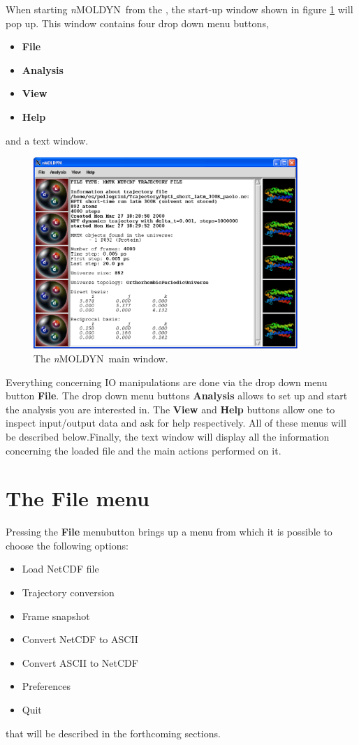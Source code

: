\documentclass[a4paper,11pt]{report}
\newcommand{\NMOLDYN}{\textit{n}MOLDYN}
\begin{document}
When starting \NMOLDYN\ from the \GUI , the start-up window shown in figure \ref{fig:main_dialog} will pop up. This window contains 
four drop down menu buttons,
\begin{itemize}
\item \textbf{File}
\item \textbf{Analysis}
\item \textbf{View}
\item \textbf{Help}
\end{itemize}  
and a text window.
\newpage
\begin{figure}[h!]
\begin{center}
\includegraphics[width=10cm]{Figures/main_dialog.eps}
\end{center}
\caption[The \textit{n}MOLDYN main window]{The \NMOLDYN\ main window.}
\label{fig:main_dialog}
\end{figure}   

Everything concerning IO manipulations are done via the drop down menu button \textbf{File}.
The drop down menu buttons \textbf{Analysis} allows to set up and start the analysis you are interested in.
The \textbf{View} and \textbf{Help} buttons allow one to inspect input/output data and ask for help 
respectively. All of these menus will be described below.Finally,  the text window will display all the information 
concerning the loaded file and the main actions performed on it.

\section{The \textbf{File} menu}
\label{file_menu}
Pressing the \textbf{File} menubutton brings up a menu from which it is possible to choose 
the following options:
\begin{itemize}
\item Load NetCDF file
\item Trajectory conversion
\item Frame snapshot
\item Convert NetCDF to ASCII
\item Convert ASCII to NetCDF
\item Preferences
\item Quit
\end{itemize}
that will be described in the forthcoming sections.
\end{document}
